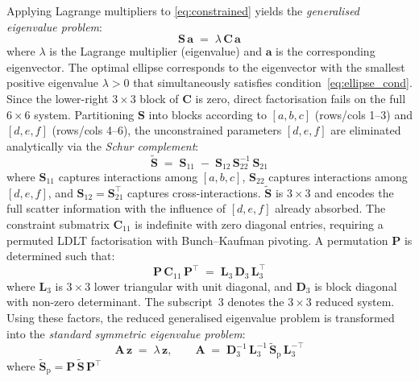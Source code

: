 \documentclass[colorlinks,upint,subscriptcorrection,varvw,hyphenate,balance,greek,russian,vietnamese,german]{asmeconf} %
\begin{document}
Applying Lagrange multipliers to \eqref{eq:constrained} yields
the \emph{generalised eigenvalue problem}:
\begin{equation}
	\mathbf{S}\,\mathbf{a} \;=\;
	\lambda\,\mathbf{C}\,\mathbf{a}
	\label{eq:gen_eig}
\end{equation}
where $\lambda$ is the Lagrange multiplier (eigenvalue) and
$\mathbf{a}$ is the corresponding eigenvector.
The optimal ellipse corresponds to the eigenvector
with the smallest positive eigenvalue $\lambda > 0$
that simultaneously satisfies condition~\eqref{eq:ellipse_cond}.
Since the lower-right $3\times3$ block of $\mathbf{C}$ is zero,
direct factorisation fails on the full $6\times6$ system.
Partitioning $\mathbf{S}$ into blocks according to
$[a,b,c]$ (rows/cols 1--3) and $[d,e,f]$ (rows/cols 4--6),
the unconstrained parameters $[d,e,f]$ are eliminated
analytically via the \emph{Schur complement}:
\begin{equation}
	\widetilde{\mathbf{S}} \;=\;
	\mathbf{S}_{11}
	\;-\;
	\mathbf{S}_{12}\,\mathbf{S}_{22}^{-1}\,\mathbf{S}_{21}
	\label{eq:schur}
\end{equation}
where $\mathbf{S}_{11}$ captures interactions among $[a,b,c]$,
$\mathbf{S}_{22}$ captures interactions among $[d,e,f]$,
and $\mathbf{S}_{12}=\mathbf{S}_{21}^\top$ captures cross-interactions.
$\widetilde{\mathbf{S}}$ is $3\times3$ and encodes the full
scatter information with the influence of $[d,e,f]$ already absorbed.
The constraint submatrix $\mathbf{C}_{11}$ is indefinite with
zero diagonal entries, requiring a permuted LDLT factorisation
with Bunch--Kaufman pivoting. A permutation $\mathbf{P}$
is determined such that:
\begin{equation}
	\mathbf{P}\,\mathbf{C}_{11}\,\mathbf{P}^\top
	\;=\; \mathbf{L}_3\,\mathbf{D}_3\,\mathbf{L}_3^\top
	\label{eq:ldlt}
\end{equation}
where $\mathbf{L}_3$ is $3\times3$ lower triangular with unit diagonal,
and $\mathbf{D}_3$ is block diagonal with non-zero determinant.
The subscript~3 denotes the $3\times3$ reduced system.
Using these factors, the reduced generalised eigenvalue problem is
transformed into the \emph{standard symmetric eigenvalue problem}:
\begin{equation}
	\mathbf{A}\,\mathbf{z} \;=\; \lambda\,\mathbf{z},
	\qquad
	\mathbf{A} \;=\;
	\mathbf{D}_3^{-1}\,\mathbf{L}_3^{-1}\,
	\widetilde{\mathbf{S}}_{\mathrm{p}}\,
	\mathbf{L}_3^{-\top}
	\label{eq:standard_eig}
\end{equation}
where $\widetilde{\mathbf{S}}_{\mathrm{p}} =
\mathbf{P}\,\widetilde{\mathbf{S}}\,\mathbf{P}^\top$
\end{document}
